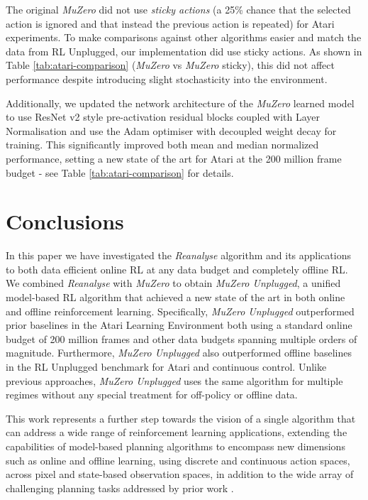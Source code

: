 \documentclass{article}
\newcommand{\muzero}{\emph{MuZero}}
\newcommand{\reanalyse}{\emph{Reanalyse}}
\newcommand{\mzunplugged}{\emph{MuZero Unplugged}}
\begin{document}
The original \muzero{} did not use \emph{sticky actions} \cite{Marlos2017Atari} (a 25\% chance that the selected action is ignored and that instead the previous action is repeated) for Atari experiments. To make comparisons against other algorithms easier and match the data from RL Unplugged, our implementation did use sticky actions. As shown in Table \ref{tab:atari-comparison} (\muzero{} vs \muzero{} sticky), this did not affect performance despite introducing slight stochasticity into the environment.

Additionally, we updated the network architecture of the \muzero{} learned model to use ResNet v2 style pre-activation residual blocks \cite{resv2} coupled with Layer Normalisation \cite{ba2016layer} and use the Adam optimiser \cite{adam} with decoupled weight decay \cite{adam_weight_decay} for training. This significantly improved both mean and median normalized performance, setting a new state of the art for Atari at the 200 million frame budget - see Table \ref{tab:atari-comparison} for details.

\section{Conclusions}

In this paper we have investigated the \reanalyse{} algorithm and its applications to both data efficient online RL at any data budget and completely offline RL. We combined \reanalyse{} with \muzero{} to obtain \mzunplugged{}, a unified model-based RL algorithm that achieved a new state of the art in both online and offline reinforcement learning. Specifically, \mzunplugged{} outperformed prior baselines in the Atari Learning Environment both using a standard online budget of 200 million frames and other data budgets spanning multiple orders of magnitude. Furthermore, \mzunplugged{} also outperformed offline baselines in the RL Unplugged benchmark for Atari and continuous control. Unlike previous approaches, \mzunplugged{} uses the same algorithm for multiple regimes without any special treatment for off-policy or offline data.

This work represents a further step towards the vision of a single algorithm that can address a wide range of reinforcement learning applications, extending the capabilities of model-based planning algorithms to encompass new dimensions such as online and offline learning, using discrete and continuous action spaces, across pixel and state-based observation spaces, in addition to the wide array of challenging planning tasks addressed by prior work \cite{Silver18AZ}.
\end{document}
